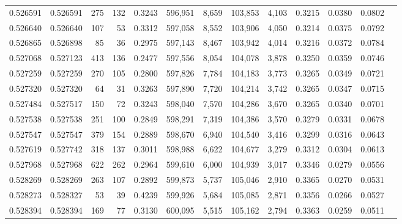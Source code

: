 \begin{tabular}{rrrrrrrrrrrrr}
0.526591 & 0.526591 &   275 &   132 &                                     0.3243 & 596,951 &   8,659 & 103,853 &   4,103 & 0.3215 & 0.0380 & 0.0802 \\
0.526640 & 0.526640 &   107 &    53 &                                     0.3312 & 597,058 &   8,552 & 103,906 &   4,050 & 0.3214 & 0.0375 & 0.0792 \\
0.526865 & 0.526898 &    85 &    36 &                                     0.2975 & 597,143 &   8,467 & 103,942 &   4,014 & 0.3216 & 0.0372 & 0.0784 \\
0.527068 & 0.527123 &   413 &   136 &                                     0.2477 & 597,556 &   8,054 & 104,078 &   3,878 & 0.3250 & 0.0359 & 0.0746 \\
0.527259 & 0.527259 &   270 &   105 &                                     0.2800 & 597,826 &   7,784 & 104,183 &   3,773 & 0.3265 & 0.0349 & 0.0721 \\
0.527320 & 0.527320 &    64 &    31 &                                     0.3263 & 597,890 &   7,720 & 104,214 &   3,742 & 0.3265 & 0.0347 & 0.0715 \\
0.527484 & 0.527517 &   150 &    72 &                                     0.3243 & 598,040 &   7,570 & 104,286 &   3,670 & 0.3265 & 0.0340 & 0.0701 \\
0.527538 & 0.527538 &   251 &   100 &                                     0.2849 & 598,291 &   7,319 & 104,386 &   3,570 & 0.3279 & 0.0331 & 0.0678 \\
0.527547 & 0.527547 &   379 &   154 &                                     0.2889 & 598,670 &   6,940 & 104,540 &   3,416 & 0.3299 & 0.0316 & 0.0643 \\
0.527619 & 0.527742 &   318 &   137 &                                     0.3011 & 598,988 &   6,622 & 104,677 &   3,279 & 0.3312 & 0.0304 & 0.0613 \\
0.527968 & 0.527968 &   622 &   262 &                                     0.2964 & 599,610 &   6,000 & 104,939 &   3,017 & 0.3346 & 0.0279 & 0.0556 \\
0.528269 & 0.528269 &   263 &   107 &                                     0.2892 & 599,873 &   5,737 & 105,046 &   2,910 & 0.3365 & 0.0270 & 0.0531 \\
0.528273 & 0.528327 &    53 &    39 &                                     0.4239 & 599,926 &   5,684 & 105,085 &   2,871 & 0.3356 & 0.0266 & 0.0527 \\
0.528394 & 0.528394 &   169 &    77 &                                     0.3130 & 600,095 &   5,515 & 105,162 &   2,794 & 0.3363 & 0.0259 & 0.0511 \\

\end{tabular}
